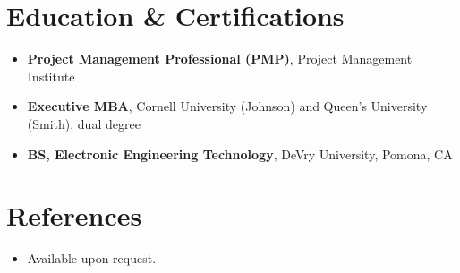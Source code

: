\documentclass[11pt,letterpaper,sans]{moderncv}
\begin{document}
\section{Education \& Certifications}
\vspace{1pt}
\begin{itemize}
\item{\textbf{Project Management Professional (PMP)}, Project Management Institute}
\item{\textbf{Executive MBA}, Cornell University (Johnson) and Queen's University (Smith), dual degree}
\item{\textbf{BS, Electronic Engineering Technology}, DeVry University, Pomona, CA}
\end{itemize}


\section{References}
\vspace{1pt}
\begin{itemize}
\item{Available upon request.}
\end{itemize}
\end{document}

